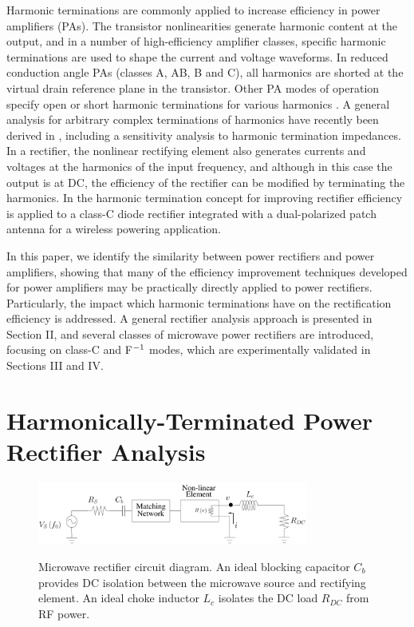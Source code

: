 Harmonic terminations are commonly applied to increase efficiency in power amplifiers (PAs). The transistor nonlinearities generate harmonic content at the output, and in a number of high-efficiency amplifier classes, specific harmonic terminations are used to shape the current and voltage waveforms. In reduced conduction angle PAs (classes A, AB, B and C), all harmonics are shorted at the virtual drain reference plane in the transistor. Other PA modes of operation specify open or short harmonic terminations for various harmonics \cite{raab01_finiteharmonics, raab02_PAoverview, kee_rutledge}. A general analysis for arbitrary complex terminations of harmonics have recently been derived in \cite{roberg2011}, including a sensitivity analysis to harmonic termination impedances. In a rectifier, the nonlinear rectifying element also generates currents and voltages at the harmonics of the input frequency, and although in this case the output is at DC, the efficiency of the rectifier can be modified by terminating the harmonics. In \cite{robergIMS2012} the harmonic termination concept for improving rectifier efficiency is applied to a class-C diode rectifier integrated with a dual-polarized patch antenna for a wireless powering application.

In this paper, we identify the similarity between power rectifiers and power amplifiers, showing that many of the efficiency improvement techniques developed for power amplifiers may be practically directly applied to power rectifiers. Particularly, the impact which harmonic terminations have on the rectification efficiency is addressed. A general rectifier analysis approach is presented in Section II, and several classes of microwave power rectifiers are introduced, focusing on class-C and F$^{\rm -1}$ modes, which are experimentally validated in Sections III and IV.


\section{Harmonically-Terminated Power Rectifier Analysis}


\begin{figure}
  \begin{center}
  \includegraphics[width=3.5in]{pdf/01.pdf}\\
  \caption{Microwave rectifier circuit diagram. An ideal blocking capacitor $C_b$ provides DC isolation between the microwave source and rectifying element.  An ideal choke inductor $L_c$ isolates the DC load $R_{DC}$ from RF power.}\label{circuit_diagram}
  \end{center}
\end{figure}

